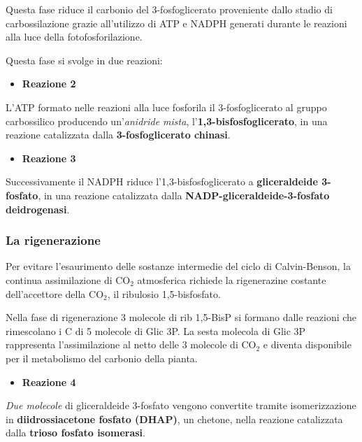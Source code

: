 \documentclass[]{article}
\begin{document}
Questa fase riduce il carbonio del 3-fosfoglicerato proveniente dallo
stadio di carbossilazione grazie all'utilizzo di ATP e NADPH generati
durante le reazioni alla luce della fotofosforilazione.

Questa fase si svolge in due reazioni:

\begin{itemize}
\itemsep1pt\parskip0pt
\item
  \textbf{Reazione 2}
\end{itemize}

L'ATP formato nelle reazioni alla luce fosforila il 3-fosfoglicerato al
gruppo carbossilico producendo un'\emph{anidride mista},
l'\textbf{1,3-bisfosfoglicerato}, in una reazione catalizzata dalla
\textbf{3-fosfoglicerato chinasi}.

\begin{itemize}
\itemsep1pt\parskip0pt
\item
  \textbf{Reazione 3}
\end{itemize}

Successivamente il NADPH riduce l'1,3-bisfosfoglicerato a
\textbf{gliceraldeide 3-fosfato}, in una reazione catalizzata dalla
\textbf{NADP-gliceraldeide-3-fosfato deidrogenasi}.

\subsubsection{La rigenerazione}\label{la-rigenerazione}

Per evitare l'esaurimento delle sostanze intermedie del ciclo di
Calvin-Benson, la continua assimilazione di CO$_2$ atmosferica richiede
la rigenerazine costante dell'accettore della CO$_2$, il ribulosio
1,5-bisfosfato.

Nella fase di rigenerazione 3 molecole di rib 1,5-BisP si formano dalle
reazioni che rimescolano i C di 5 molecole di Glic 3P. La sesta molecola
di Glic 3P rappresenta l'assimilazione al netto delle 3 molecole di
CO$_2$ e diventa disponibile per il metabolismo del carbonio della
pianta.

\begin{itemize}
\itemsep1pt\parskip0pt
\item
  \textbf{Reazione 4}
\end{itemize}

\emph{Due molecole} di gliceraldeide 3-fosfato vengono convertite
tramite isomerizzazione in \textbf{diidrossiacetone fosfato (DHAP)}, un
chetone, nella reazione catalizzata dalla \textbf{trioso fosfato
isomerasi}.
\end{document}
